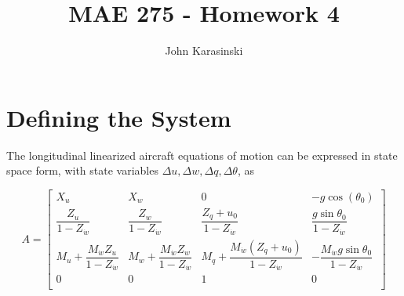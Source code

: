 \documentclass[12pt]{article}
\title{MAE 275 - Homework 4}
\author{John Karasinski}
\begin{document}
\maketitle

\section{Defining the System}
The longitudinal linearized aircraft equations of motion can be expressed in state space form, with state variables $\Delta u, \Delta w, \Delta q, \Delta \theta$, as

\begin{equation*}
A =
\begin{bmatrix}
    X_u & X_w & 0 & -g \cos(\theta_0) \\
    \dfrac{Z_u}{1-Z_{\dot{w}}} & \dfrac{Z_w}{1-Z_{\dot{w}}} & \dfrac{Z_q + u_0}{1-Z_{\dot{w}}} & \dfrac{g\sin \theta_0}{1-Z_{\dot{w}}} \\
    M_u + \dfrac{M_{\dot{w}} Z_u}{1-Z_{\dot{w}}} & M_w + \dfrac{M_{\dot{w}} Z_w}{1-Z_{\dot{w}}} & M_q + \dfrac{M_{\dot{w}} (Z_q + u_0)}{1-Z_{\dot{w}}} & -\dfrac{M_{\dot{w}} g\sin \theta_0}{1-Z_{\dot{w}}} \\
    0 & 0 & 1 & 0 \\
\end{bmatrix}
\end{equation*}
\end{document}
